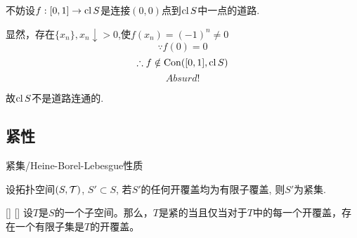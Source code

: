 \documentclass[UTF8]{ctexart}
\begin{document}


            
            \begin{prf}
                不妨设\(f:[0,1]\to \operatorname{cl} S\)是连接\((0,0)\)点到\(\operatorname{cl} S\)中一点的道路.

                显然，存在\(\{x_n\},x_n\downarrow>0\),使\(f(x_n)=(-1)^n\neq0\)
                \[\because f(0)=0\]
                \[\therefore f\notin\operatorname{Con}([0,1],\operatorname{cl} S)\]
                \[Absurd!\]

                故\(\operatorname{cl} S\)不是道路连通的.
            \end{prf}

        \subsection{紧性}

            \begin{dfn}
                {紧集/Heine-Borel-Lebesgue性质}

                设拓扑空间$(S,\operatorname{\mathcal{T}})$, $S'\subset S$, 若$S'$的任何开覆盖均为有限子覆盖, 则$S'$为紧集. 
            \end{dfn}

            \begin{thm}
                []
                {}
                []
                []
                设\(T\)是\(S\)的一个子空间。那么，\(T\)是紧的当且仅当对于\(T\)中的每一个开覆盖，存在一个有限子集是\(T\)的开覆盖。
            \end{thm}
            
\end{document}
